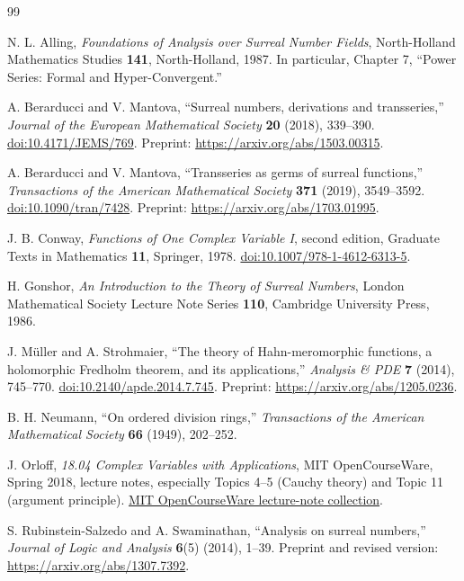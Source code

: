 \documentclass[11pt,a4paper]{article}
\numberwithin{equation}{section}
\theoremstyle{definition}
\begin{document}
\begin{thebibliography}{99}

N. L. Alling, \emph{Foundations of Analysis over Surreal Number Fields},
North-Holland Mathematics Studies \textbf{141}, North-Holland, 1987.
In particular, Chapter 7, ``Power Series: Formal and Hyper-Convergent.''

A. Berarducci and V. Mantova, ``Surreal numbers, derivations and
transseries,'' \emph{Journal of the European Mathematical Society}
\textbf{20} (2018), 339--390.
\href{https://doi.org/10.4171/JEMS/769}{doi:10.4171/JEMS/769}.
Preprint: \url{https://arxiv.org/abs/1503.00315}.

A. Berarducci and V. Mantova, ``Transseries as germs of surreal functions,''
\emph{Transactions of the American Mathematical Society}
\textbf{371} (2019), 3549--3592.
\href{https://doi.org/10.1090/tran/7428}{doi:10.1090/tran/7428}.
Preprint: \url{https://arxiv.org/abs/1703.01995}.

J. B. Conway, \emph{Functions of One Complex Variable I}, second edition,
Graduate Texts in Mathematics \textbf{11}, Springer, 1978.
\href{https://doi.org/10.1007/978-1-4612-6313-5}{doi:10.1007/978-1-4612-6313-5}.

H. Gonshor, \emph{An Introduction to the Theory of Surreal Numbers},
London Mathematical Society Lecture Note Series \textbf{110},
Cambridge University Press, 1986.

J. M\"uller and A. Strohmaier, ``The theory of Hahn-meromorphic functions,
a holomorphic Fredholm theorem, and its applications,''
\emph{Analysis \& PDE} \textbf{7} (2014), 745--770.
\href{https://doi.org/10.2140/apde.2014.7.745}{doi:10.2140/apde.2014.7.745}.
Preprint: \url{https://arxiv.org/abs/1205.0236}.

B. H. Neumann, ``On ordered division rings,''
\emph{Transactions of the American Mathematical Society}
\textbf{66} (1949), 202--252.

J. Orloff, \emph{18.04 Complex Variables with Applications},
MIT OpenCourseWare, Spring 2018, lecture notes, especially Topics 4--5
(Cauchy theory) and Topic 11 (argument principle).
\href{https://ocw.mit.edu/courses/18-04-complex-variables-with-applications-spring-2018/pages/lecture-notes/}{MIT OpenCourseWare lecture-note collection}.

S. Rubinstein-Salzedo and A. Swaminathan, ``Analysis on surreal numbers,''
\emph{Journal of Logic and Analysis} \textbf{6}(5) (2014), 1--39.
Preprint and revised version: \url{https://arxiv.org/abs/1307.7392}.

\end{thebibliography}
\end{document}
